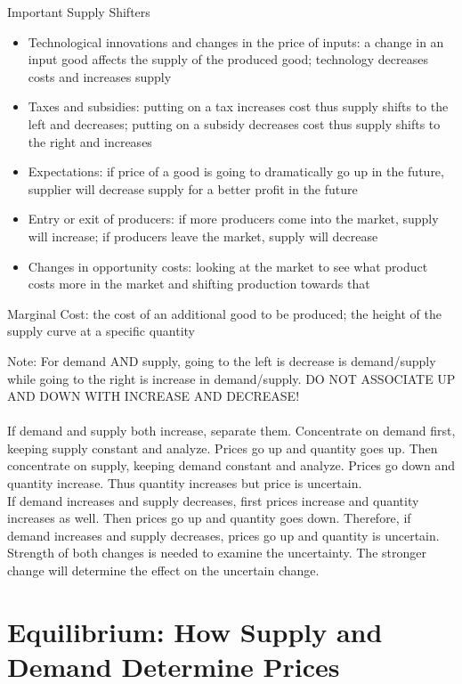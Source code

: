 \documentclass[12pt]{article}
\begin{document}
Important Supply Shifters \begin{itemize} 
\item Technological innovations and changes in the price of inputs: a change in an input good affects the supply of the produced good; technology decreases costs and increases supply 
\item Taxes and subsidies: putting on a tax increases cost thus supply shifts to the left and decreases; putting on a subsidy decreases cost thus supply shifts to the right and increases 
\item Expectations: if price of a good is going to dramatically go up in the future, supplier will decrease supply for a better profit in the future 
\item Entry or exit of producers: if more producers come into the market, supply will increase; if producers leave the market, supply will decrease 
\item Changes in opportunity costs: looking at the market to see what product costs more in the market and shifting production towards that 
 \end{itemize} 
\begin{definition} Marginal Cost: the cost of an additional good to be produced; the height of the supply curve at a specific quantity \end{definition}
Note: For demand AND supply, going to the left is decrease is demand/supply while going to the right is increase in demand/supply. DO NOT ASSOCIATE UP AND DOWN WITH INCREASE AND DECREASE! \\~\\
If demand and supply both increase, separate them. Concentrate on demand first, keeping supply constant and analyze. Prices go up and quantity goes up. Then concentrate on supply, keeping demand constant and analyze. Prices go down and quantity increase. Thus quantity increases but price is uncertain. \\ If demand increases and supply decreases, first prices increase and quantity increases as well. Then prices go up and quantity goes down. Therefore, if demand increases and supply decreases, prices go up and quantity is uncertain. Strength of both changes is needed to examine the uncertainty. The stronger change will determine the effect on the uncertain change. 

\section{Equilibrium: How Supply and Demand Determine Prices} 
\end{document}
